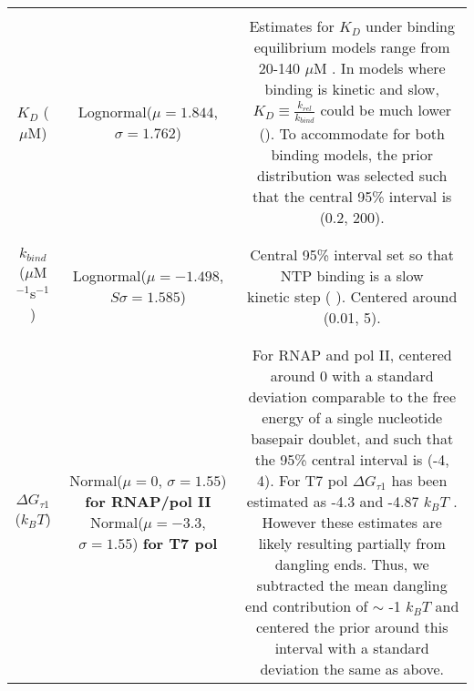 \documentclass[10pt,letterpaper]{article}
\begin{document}
\begin{table}[!htb]
\begin{adjustwidth}{-2.25in}{0in}
{\begin{tabular}{|ccc|}
&&\\
\hline
&&\\


$K_D$ ($\mu$M) & Lognormal($\mu = 1.844$, $\sigma = 1.762$)
 & \makecell{ Estimates for $K_D$ under binding equilibrium models range \\ from 20-140 $\mu$M \cite{rhodes1974ribonucleic, bai2007mechanochemical, kireeva2008transient, larson2012trigger, thomen2005unravelling}. In models where binding is \\ kinetic and slow, $K_D \equiv \frac{k_{rel}}{k_{bind}}$ could be much lower \\ (\nameref{S4_Appendix}). To accommodate for both binding models, \\ the prior distribution was selected such that the central \\ 95\% interval is (0.2, 200).} \\
&&\\
\hline
&&\\

$k_{bind}$ ($\mu$M$^{-1}$s$^{-1}$) & Lognormal($\mu = -1.498$, $S\sigma = 1.585$) & \makecell{
    Central 95\% interval set so that NTP binding is a slow \\ kinetic step (\nameref{S4_Appendix} ). Centered around (0.01, 5).  }  \\

&&\\
\hline
&&\\


$\Delta G_{\tau 1}$ ($k_B T$) & \makecell{ Normal($\mu = 0$, $\sigma = 1.55$) \textbf{for RNAP/pol II} \\ Normal($\mu = -3.3$, $\sigma = 1.55$) \textbf{for T7 pol}}  & \makecell{For RNAP and pol II, centered around 0 with a standard \\ deviation comparable to the free energy of a single nucleotide \\ basepair doublet, and such that the 95\% central interval is (-4, 4). \\ For T7 pol $\Delta G_{\tau 1}$ has been estimated as -4.3 \cite{thomen2005unravelling} and \\ -4.87   $k_BT$ \cite{yin2004structural}. However these estimates are likely resulting \\ partially from dangling ends. Thus, we subtracted the mean \\ dangling end contribution of $\sim$ -1 $k_BT$ \cite{santalucia1998unified} and centered the prior \\ around this interval with a standard deviation the same as above.
} \\


\end{tabular}}
\end{adjustwidth}
\end{table}
\end{document}
